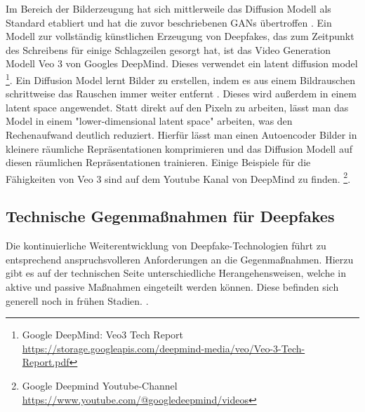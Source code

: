 Im Bereich der Bilderzeugung hat sich mittlerweile das Diffusion Modell als Standard etabliert \cite{guptaPhotorealisticVideoGeneration} 
und hat die zuvor beschriebenen GANs übertroffen \cite{williampeeblesScalableDiffusionModels}. 
Ein Modell zur vollständig künstlichen Erzeugung von Deepfakes, das zum Zeitpunkt des Schreibens für einige Schlagzeilen \cite{proschofskyGooglesNeueVideoKI2025} gesorgt hat, 
ist das Video Generation Modell Veo 3 von Googles DeepMind. Dieses verwendet ein latent diffusion model \footnote{Google DeepMind:
 Veo3 Tech Report
 \url{https://storage.googleapis.com/deepmind-media/veo/Veo-3-Tech-Report.pdf}}.
Ein Diffusion Model lernt Bilder zu erstellen, indem es aus einem Bildrauschen schrittweise das Rauschen immer weiter entfernt \cite{guptaPhotorealisticVideoGeneration}. 
Dieses wird außerdem in einem latent space angewendet. Statt direkt auf den Pixeln zu arbeiten, 
lässt man das Model in einem "lower-dimensional latent space" \cite[S.2]{guptaPhotorealisticVideoGeneration} arbeiten, was den Rechenaufwand deutlich reduziert. 
Hierfür lässt man einen Autoencoder Bilder in kleinere räumliche Repräsentationen komprimieren und das Diffusion Modell auf diesen räumlichen Repräsentationen trainieren. 
Einige Beispiele für die Fähigkeiten von Veo 3 sind auf dem Youtube Kanal von DeepMind zu finden. \footnote{
    Google Deepmind Youtube-Channel
    \url{https://www.youtube.com/@googledeepmind/videos}
}.

\subsection{Technische Gegenmaßnahmen für Deepfakes}
Die kontinuierliche Weiterentwicklung von Deepfake-Technologien führt zu entsprechend anspruchsvolleren Anforderungen an die Gegenmaßnahmen.
Hierzu gibt es auf der technischen Seite unterschiedliche Herangehensweisen, welche in aktive und passive Maßnahmen eingeteilt werden können. 
Diese befinden sich generell noch in frühen Stadien. \cite{abbasUnmaskingDeepfakesSystematic2024}.
